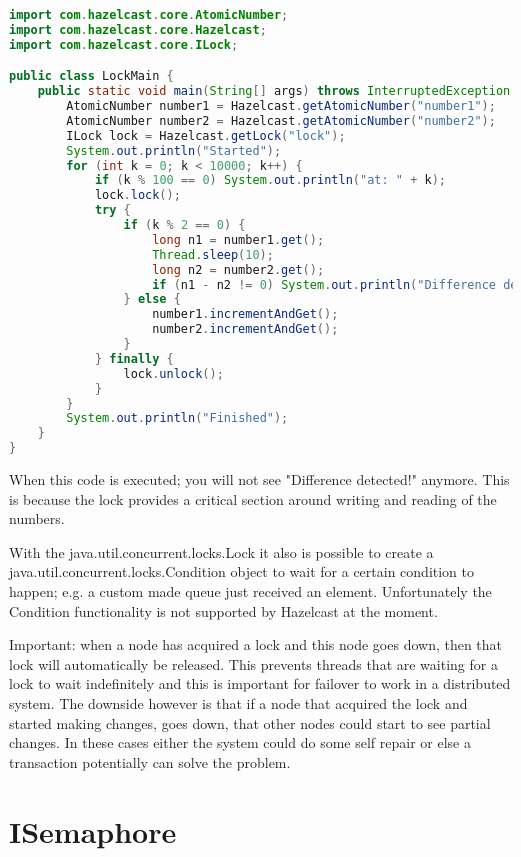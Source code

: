 \begin{lstlisting}[language=java]
import com.hazelcast.core.AtomicNumber;
import com.hazelcast.core.Hazelcast;
import com.hazelcast.core.ILock;

public class LockMain {
    public static void main(String[] args) throws InterruptedException {
        AtomicNumber number1 = Hazelcast.getAtomicNumber("number1");
        AtomicNumber number2 = Hazelcast.getAtomicNumber("number2");
        ILock lock = Hazelcast.getLock("lock");
        System.out.println("Started");
        for (int k = 0; k < 10000; k++) {
            if (k % 100 == 0) System.out.println("at: " + k);
            lock.lock();
            try {
                if (k % 2 == 0) {
                    long n1 = number1.get();
                    Thread.sleep(10);
                    long n2 = number2.get();
                    if (n1 - n2 != 0) System.out.println("Difference detected!");
                } else {
                    number1.incrementAndGet();
                    number2.incrementAndGet();
                }
            } finally {
                lock.unlock();
            }
        }
        System.out.println("Finished");
    }
}
\end{lstlisting}

When this code is executed; you will not see "Difference detected!" anymore. This is because the lock provides a critical section around writing and reading of the numbers. 

With the java.util.concurrent.locks.Lock it also is possible to create a java.util.concurrent.locks.Condition object to wait for a certain condition to happen; e.g. a custom made queue just received an element. Unfortunately the Condition functionality is not supported by Hazelcast at the moment.

Important: when a node has acquired a lock and this node goes down, then that lock will automatically be released. This prevents threads that are waiting for a lock to wait indefinitely and this is important for failover to work in a distributed system. The downside however is that if a node that acquired the lock and started making changes, goes down, that other nodes could start to see partial changes. In these cases either the system could do some self repair or else a transaction potentially can solve the problem.

\section{ISemaphore}

